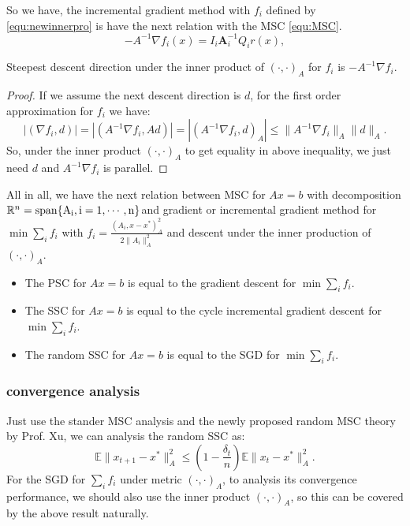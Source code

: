 So we have, the incremental gradient method with $f_i$ defined by \ref{equ:newinnerpro} is have the next relation with the MSC \ref{equ:MSC}. 
\begin{equation}
-A^{-1} \nabla f_i(x) = I_i \bm{A}_i^{-1}Q_i r(x),
\end{equation}

\begin{lemma}
	Steepest descent direction under the inner product of $(\cdot, \cdot)_A$ for $f_i$ is $- A^{-1} \nabla f_i$. 
\end{lemma}
\begin{proof}
	If we assume the next descent direction is $d$, for the first order approximation for $f_i$ we have:
	\begin{equation}
	|(\nabla f_i, d)| = |(A^{-1} \nabla f_i, A d)| = |(A^{-1} \nabla f_i, d)_A| \le \|A^{-1} \nabla f_i\|_A \|d\|_A.
	\end{equation}
	So, under the inner product $(\cdot, \cdot)_A$ to get equality in above inequality, we just need $ d $ and $A^{-1} \nabla f_i$ is parallel. 
\end{proof}

All in all, we have the next relation between MSC for $Ax = b$ with decomposition $\mathbb{R}^n = \rm{span}\{A_i, i = 1, \cdots, n\}$and gradient or incremental gradient method for $\min \sum_i f_i$ with 
$f_i = \frac{(A_i, x - x^*)_A^2}{2\|A_i\|_A^2}$ and descent under the inner production of $(\cdot, \cdot)_A$. 
\begin{itemize}
	\item The PSC for $Ax = b$ is equal to the gradient descent for $\min \sum_i f_i$.
	\item The SSC for $Ax = b$ is equal to the cycle incremental gradient descent for $\min \sum_i f_i$.
	\item The random SSC for $Ax = b$ is equal to the SGD for $\min \sum_i f_i$.
\end{itemize}

\subsubsection{convergence analysis}
Just use the stander MSC analysis and the newly proposed random MSC theory by Prof. Xu, we can analysis the random SSC as:
\begin{equation}
\mathbb{E} \|x_{t+1} - x^*\|_A^2 \le (1 - \frac{\delta_t}{n})\mathbb{E} \|x_{t} - x^*\|_A^2.
\end{equation}
For the SGD for $\sum_i f_i$ under metric $(\cdot,\cdot)_A$, to analysis its convergence performance, we should also use the inner product $(\cdot,\cdot)_A$, so this can be covered by the above result naturally. 



